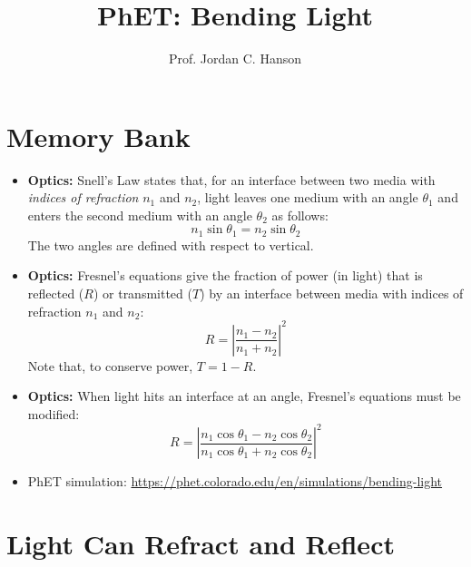 \documentclass{article}
\begin{document}
\title{PhET: Bending Light}
\author{Prof. Jordan C. Hanson}

\maketitle

\section{Memory Bank}

\begin{itemize}
\item \textbf{Optics:} Snell's Law states that, for an interface between two media with \textit{indices of refraction} $n_1$ and $n_2$, light leaves one medium with an angle $\theta_1$ and enters the second medium with an angle $\theta_2$ as follows:
\begin{equation}
n_1 \sin\theta_1 = n_2\sin\theta_2 \label{eq:1}
\end{equation}
\noindent The two angles are defined with respect to vertical.
\item \textbf{Optics:} Fresnel's equations give the fraction of power (in light) that is reflected ($R$) or transmitted ($T$) by an interface between media with indices of refraction $n_1$ and $n_2$:
\begin{equation}
R = \left| \frac{n_1 - n_2}{n_1 + n_2} \right|^2 \label{eq:2}
\end{equation}
\noindent Note that, to conserve power, $T = 1 - R$.
\item \textbf{Optics:} When light hits an interface at an angle, Fresnel's equations must be modified:
\begin{equation}
R = \left| \frac{n_1\cos\theta_1 - n_2\cos\theta_2}{n_1\cos\theta_1 + n_2\cos\theta_2} \right|^2 \label{eq:3}
\end{equation}
\item PhET simulation: \url{https://phet.colorado.edu/en/simulations/bending-light}
\end{itemize}

\section{Light Can Refract and Reflect}
\end{document}

